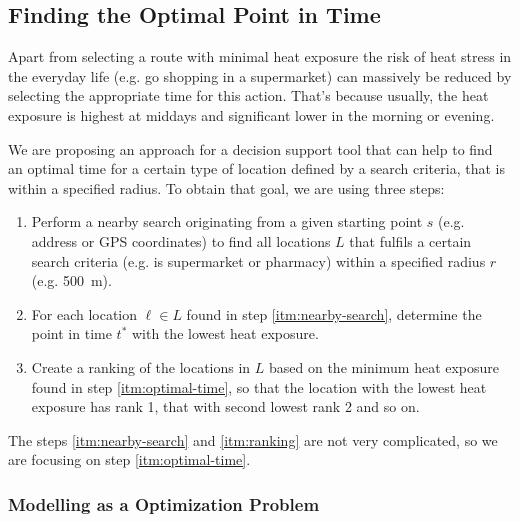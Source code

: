  \subsection{Finding the Optimal Point in Time}
 
 Apart from selecting a route with minimal heat exposure the risk of heat stress in the everyday life (e.g. go shopping in a supermarket) can massively be reduced by selecting the appropriate time for this action. That's because usually, the heat exposure is highest at middays and significant lower in the morning or evening.
 
 We are proposing an approach for a decision support tool that can help to find an optimal time for a certain type of location defined by a search criteria, that is within a specified radius. To obtain that goal, we are using three steps:
 
 \begin{enumerate}
 	\item \label{itm:nearby-search} Perform a nearby search originating from a given starting point $s$  (e.g. address or GPS coordinates) to find all locations $L$ that fulfils a certain search criteria (e.g. is supermarket or pharmacy)  within a specified radius $r$ (e.g. \SI{500}{\meter}).
 	
 	\item \label{itm:optimal-time} For each location $\ell \in L$ found in step \ref{itm:nearby-search}, determine the point in time $t^*$ with the lowest heat exposure. 
 	
 	\item \label{itm:ranking} Create a ranking of the locations in $L$ based on the minimum heat exposure found in step \ref{itm:optimal-time}, so that the location with the lowest heat exposure has rank 1, that with second lowest rank 2 and so on.
 \end{enumerate} 

The steps \ref{itm:nearby-search} and \ref{itm:ranking} are not very complicated, so we are focusing on step \ref{itm:optimal-time}. 

\subsubsection{Modelling as a Optimization Problem} 

